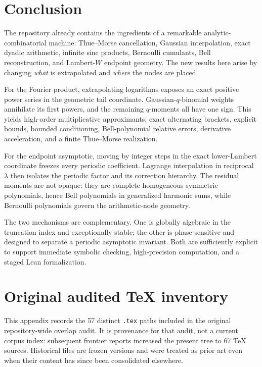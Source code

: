 \documentclass[11pt]{article}
\theoremstyle{definition}
\theoremstyle{remark}
\begin{document}
\section{Conclusion}

The repository already contains the ingredients of a remarkable analytic-combinatorial machine: Thue--Morse cancellation, Gaussian interpolation, exact dyadic arithmetic, infinite sinc products, Bernoulli cumulants, Bell reconstruction, and Lambert-$W$ endpoint geometry. The new results here arise by changing \emph{what} is extrapolated and \emph{where} the nodes are placed.

For the Fourier product, extrapolating logarithms exposes an exact positive power series in the geometric tail coordinate. Gaussian-$q$-binomial weights annihilate its first powers, and the remaining $q$-moments all have one sign. This yields high-order multiplicative approximants, exact alternating brackets, explicit bounds, bounded conditioning, Bell-polynomial relative errors, derivative acceleration, and a finite Thue--Morse realization.

For the endpoint asymptotic, moving by integer steps in the exact lower-Lambert coordinate freezes every periodic coefficient. Lagrange interpolation in reciprocal $\lambda$ then isolates the periodic factor and its correction hierarchy. The residual moments are not opaque: they are complete homogeneous symmetric polynomials, hence Bell polynomials in generalized harmonic sums, while Bernoulli polynomials govern the arithmetic-node geometry.

The two mechanisms are complementary. One is globally algebraic in the truncation index and exceptionally stable; the other is phase-sensitive and designed to separate a periodic asymptotic invariant. Both are sufficiently explicit to support immediate symbolic checking, high-precision computation, and a staged Lean formalization.

\appendix

\section{Original audited TeX inventory}
\label{app:inventory}

This appendix records the 57 distinct \texttt{.tex} paths included in the original
repository-wide overlap audit.  It is provenance for that audit, not a current corpus
index: subsequent frontier reports increased the present tree to 67 TeX sources.
Historical files are frozen versions and were treated as prior art even when their content
has since been consolidated elsewhere.
\end{document}
